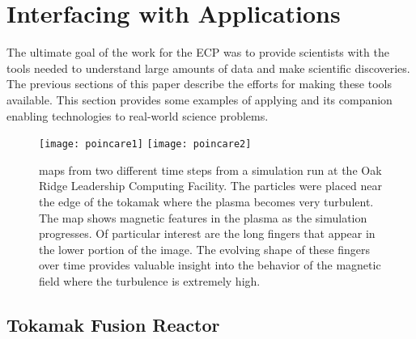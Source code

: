 \section{Interfacing with Applications}

The ultimate goal of the \vtkm work for the ECP was to provide scientists with the tools needed to understand large amounts of data and make scientific discoveries.
The previous sections of this paper describe the efforts for making these tools available.
This section provides some examples of applying \vtkm and its companion enabling technologies to real-world science problems.


\begin{figure}[ht]
  \centering
  \texttt{[image: poincare1]}
  \texttt{[image: poincare2]}
  \caption{\poincare maps from two different time steps from a simulation run at the Oak Ridge Leadership Computing Facility.  The particles were placed near the edge of the tokamak where the plasma becomes very turbulent. The \poincare map shows magnetic features in the plasma as the simulation progresses. Of particular interest are the long fingers that appear in the lower portion of the image. The evolving shape of these fingers over time provides valuable insight into the behavior of the magnetic field where the turbulence is extremely high. }
  \label{fig:poincare}
\end{figure}

\subsection{Tokamak Fusion Reactor}


